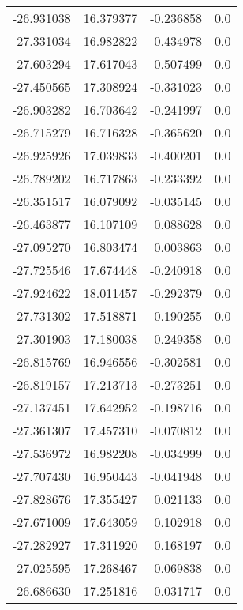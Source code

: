 \begin{tabular}{rrrr}
      -26.931038 &        16.379377 &   -0.236858 &   0.0 \\
      -27.331034 &        16.982822 &   -0.434978 &   0.0 \\
      -27.603294 &        17.617043 &   -0.507499 &   0.0 \\
      -27.450565 &        17.308924 &   -0.331023 &   0.0 \\
      -26.903282 &        16.703642 &   -0.241997 &   0.0 \\
      -26.715279 &        16.716328 &   -0.365620 &   0.0 \\
      -26.925926 &        17.039833 &   -0.400201 &   0.0 \\
      -26.789202 &        16.717863 &   -0.233392 &   0.0 \\
      -26.351517 &        16.079092 &   -0.035145 &   0.0 \\
      -26.463877 &        16.107109 &    0.088628 &   0.0 \\
      -27.095270 &        16.803474 &    0.003863 &   0.0 \\
      -27.725546 &        17.674448 &   -0.240918 &   0.0 \\
      -27.924622 &        18.011457 &   -0.292379 &   0.0 \\
      -27.731302 &        17.518871 &   -0.190255 &   0.0 \\
      -27.301903 &        17.180038 &   -0.249358 &   0.0 \\
      -26.815769 &        16.946556 &   -0.302581 &   0.0 \\
      -26.819157 &        17.213713 &   -0.273251 &   0.0 \\
      -27.137451 &        17.642952 &   -0.198716 &   0.0 \\
      -27.361307 &        17.457310 &   -0.070812 &   0.0 \\
      -27.536972 &        16.982208 &   -0.034999 &   0.0 \\
      -27.707430 &        16.950443 &   -0.041948 &   0.0 \\
      -27.828676 &        17.355427 &    0.021133 &   0.0 \\
      -27.671009 &        17.643059 &    0.102918 &   0.0 \\
      -27.282927 &        17.311920 &    0.168197 &   0.0 \\
      -27.025595 &        17.268467 &    0.069838 &   0.0 \\
      -26.686630 &        17.251816 &   -0.031717 &   0.0 \\

\end{tabular}
